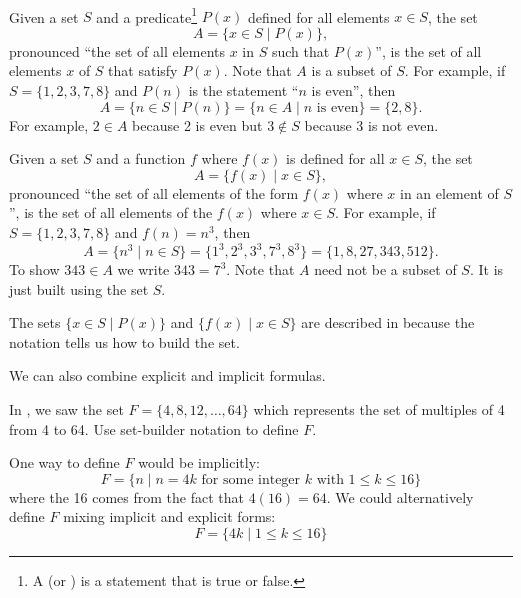 \begin{defn}
\label{defn_set_builder_notation}
~
    \begin{apart}
        \item Given a set $S$ and a predicate\footnote{A  (or ) is a statement that is true or false.}  $P(x)$ defined for all elements $x \in S$, the set 
            $$A=\{ x \in S \mid P(x)\},$$ 
            pronounced ``the set of all elements $x$ in $S$ such that $P(x)$'', is the set of all elements $x$ of $S$ that satisfy  $P(x)$.  Note that $A$ is a subset of $S$. For example, if $S=\{1,2,3,7,8\}$ and $P(n)$ is the statement ``$n$ is even'', then
            $$A = \{ n \in S \mid P(n)\} = \{ n \in A \mid n \text{ is even}\}= \{2,8\}.$$  For example, $2 \in A$ because 2 is even but $3 \notin S$ because 3 is not even.
        \item Given a set $S$ and a function $f$ where $f(x)$ is defined for all $x \in S$, the set 
            $$A=\{ f(x) \mid x \in S\},$$ 
            pronounced ``the set of all elements of the form $f(x)$ where $x$ in an element of $S$'', is the set of all elements of the  $f(x)$ where $x\in S$. For example, if $S=\{1,2,3,7,8\}$ and $f(n)=n^3$, then 
            $$A = \{ n^3 \mid n \in S\} = \{1^3,2^3,3^3,7^3,8^3\}= \{1, 8, 27, 343, 512\}.$$ To show $343 \in A$ we write $343=7^3$. Note that $A$ need not be a subset of $S$.  It is just built using the set $S$.
        \item The sets $\{ x \in S \mid P(x)\}$ and $\{ f(x) \mid x \in S\}$ are described in  because the notation tells us how to build the set.
    \end{apart}
\end{defn}

We can also combine explicit and implicit formulas.

\begin{exam}
\label{exam_set_mult4}
    In , we saw the set $F = \{4,8,12,\ldots, 64\}$ which represents the set of multiples of 4 from 4 to 64.  Use set-builder notation to define $F$.
        \begin{soln}
            One way to define $F$ would be implicitly:
                $$F = \{ n \mid n = 4k \text{ for some integer } k \text{ with } 1 \le k \le 16\}$$
            where the 16  comes from the fact that $4(16)=64$.
            We could alternatively define $F$ mixing implicit and explicit forms:
                $$F = \{ 4k \mid 1 \le k \le 16\}$$
        \end{soln}
\end{exam}

